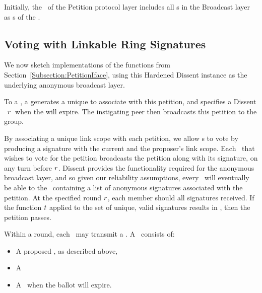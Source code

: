 %
Initially, the \KwManifest~of the Petition protocol layer includes all \KwNode s
in the Broadcast layer as \KwMember s of the \KwCluster.

\subsection{Voting with Linkable Ring Signatures}
We now sketch implementations of the functions from
Section~\ref{Subsection:PetitionIface}, using this Hardened Dissent instance as
the underlying anonymous broadcast layer.

To \NamePropose a \StructPetition, a \KwPeer generates a unique \KwLinkScope to
associate with this petition, and specifies a Dissent \KwRound~$r$~when the
\StructPetition will expire. The instigating peer then broadcasts this petition
to the group.

By associating a unique link scope with each petition, we allow \KwMember s to
vote by producing a signature with the current \KwRoster and the proposer's link
scope. Each \KwMember~that wishes to vote for the petition broadcasts the
petition along with its signature, on any turn before $r$. Dissent provides
the functionality required for the anonymous broadcast layer, and so given our
reliability assumptions, every \KwMember~will eventually be able to \NameReceive
the \StructElectionState~containing a list of anonymous signatures associated
with the petition. At the specified round $r$, each member should
\NameEvaluate all signatures received. If the function $t$ applied to the
set of unique, valid signatures results in \AtomTrue, then the petition passes.

Within a round, each \KwMember~may  transmit a \KwPetition. A
\KwPetition~consists of:
\begin{itemize}
  \item A proposed \KwManifest, as described above,
  \item A \KwLinkScope{}
  \item A \KwRound~when the ballot will expire.
\end{itemize}

